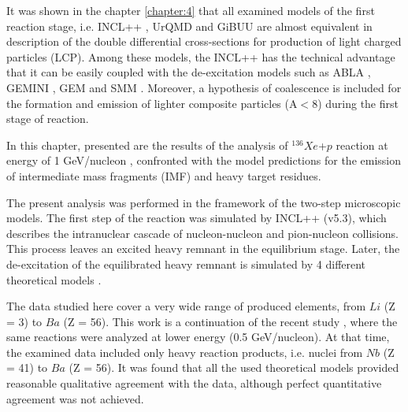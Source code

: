 
It was shown in the chapter \ref{chapter:4} that all examined models of the first reaction stage, i.e. INCL++ \cite{INCLMancusi2014}, UrQMD \cite{UrQMDBASS1998,UrQMDBleicher1999} and GiBUU \cite{GiBUUBuss2012}  are almost equivalent in description of the double differential cross-sections for production of light charged particles (LCP). Among these models, the INCL++  has the technical advantage that it can be easily coupled with the de-excitation models such as ABLA \cite{kelic2009abla07}, GEMINI  \cite{CHARITY1988,Charity2010}, GEM  \cite{FURIHATA2000,Furihata2002} and SMM  \cite{SMMBondorf1995}. Moreover, a hypothesis of  coalescence is included for the formation and  emission of lighter composite  particles (A$<$8) during the first stage of reaction. 

In this chapter, presented are the results of the analysis of $^{136}Xe$+$p$ reaction at energy of 
1 GeV/nucleon \cite{napolitani2007measurement}, confronted with the model predictions for the emission of intermediate mass fragments (IMF)  and heavy target residues.

The present analysis was performed in the framework of the two-step microscopic models. The first step of the reaction was simulated by INCL++ (v5.3), which describes the intranuclear cascade of nucleon-nucleon and pion-nucleon collisions. This process leaves an excited heavy remnant in the equilibrium stage. Later, the de-excitation of the equilibrated heavy remnant  is simulated by 4 different theoretical models  \cite{kelic2009abla07,Furihata2002,Charity2010,SMMBondorf1995}. 

The data studied here cover a very wide range of produced elements, from $Li$ (Z = 3) to $Ba$ (Z = 56). This work is a continuation of the recent study \cite{sharma2017ranking}, where the same reactions were analyzed at lower energy (0.5 GeV/nucleon). At that time, the examined data  \cite{giot2013isotopic} included only heavy reaction products, i.e. nuclei from $Nb$ (Z = 41) to $Ba$ (Z = 56). It was found that all the used theoretical models provided reasonable qualitative agreement with the data, although perfect quantitative agreement was not achieved.





